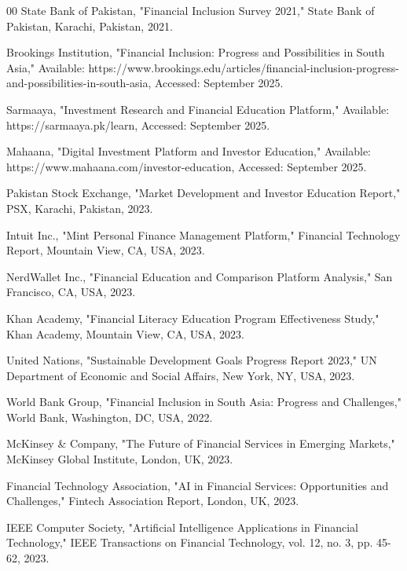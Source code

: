 \documentclass[conference]{IEEEtran}
\begin{document}
\begin{thebibliography}{00}
 State Bank of Pakistan, "Financial Inclusion Survey 2021," State Bank of Pakistan, Karachi, Pakistan, 2021.

 Brookings Institution, "Financial Inclusion: Progress and Possibilities in South Asia," Available: https://www.brookings.edu/articles/financial-inclusion-progress-and-possibilities-in-south-asia, Accessed: September 2025.

 Sarmaaya, "Investment Research and Financial Education Platform," Available: https://sarmaaya.pk/learn, Accessed: September 2025.

 Mahaana, "Digital Investment Platform and Investor Education," Available: https://www.mahaana.com/investor-education, Accessed: September 2025.

 Pakistan Stock Exchange, "Market Development and Investor Education Report," PSX, Karachi, Pakistan, 2023.

 Intuit Inc., "Mint Personal Finance Management Platform," Financial Technology Report, Mountain View, CA, USA, 2023.

 NerdWallet Inc., "Financial Education and Comparison Platform Analysis," San Francisco, CA, USA, 2023.

 Khan Academy, "Financial Literacy Education Program Effectiveness Study," Khan Academy, Mountain View, CA, USA, 2023.

 United Nations, "Sustainable Development Goals Progress Report 2023," UN Department of Economic and Social Affairs, New York, NY, USA, 2023.

 World Bank Group, "Financial Inclusion in South Asia: Progress and Challenges," World Bank, Washington, DC, USA, 2022.

 McKinsey \& Company, "The Future of Financial Services in Emerging Markets," McKinsey Global Institute, London, UK, 2023.

 Financial Technology Association, "AI in Financial Services: Opportunities and Challenges," Fintech Association Report, London, UK, 2023.

 IEEE Computer Society, "Artificial Intelligence Applications in Financial Technology," IEEE Transactions on Financial Technology, vol. 12, no. 3, pp. 45-62, 2023.

\end{thebibliography}
\end{document}
